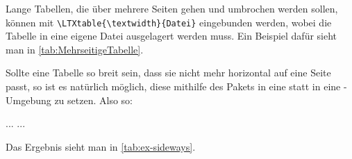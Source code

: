 Lange Tabellen, die über mehrere Seiten gehen und umbrochen werden sollen, können mit
\lstinline|\LTXtable{\textwidth}{Datei}|
eingebunden werden, wobei die Tabelle in eine eigene Datei ausgelagert werden muss.
Ein Beispiel dafür sieht man in \cref{tab:MehrseitigeTabelle}.

\begingroup%
\tablestylealtcolored%
\setlength{\topskip}{0pt}%
\setlength{\LTpre}{0pt}%
\setlength{\LTpost}{0pt}%
\endgroup%

Sollte eine Tabelle so breit sein, dass sie nicht mehr horizontal auf
eine Seite passt, so ist es natürlich möglich, diese mithilfe des Pakets
 \parencite{Sommerfeldt2004} in eine
 statt in eine -Umgebung zu setzen.
Also so:
\begin{latex}[caption={Gedrehte Tabelle},label={lst:rotated-table}]
\begin{table}
  \raggedleft%
  \begin{tabular}{...}%
    ...
  \end{tabular}%
  \caption{Bezeichnung}%
  \label{Referenzmarke}%
\end{table}%
\end{latex}

Das Ergebnis sieht man in \cref{tab:ex-sideways}.

